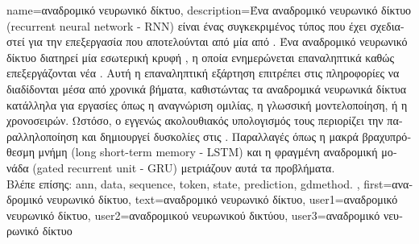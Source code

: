 {name={\foreignlanguage{greek}{αναδρομικό νευρωνικό δίκτυο}},
	description={\foreignlanguage{greek}{Ένα αναδρομικό νευρωνικό δίκτυο} (recurrent neural network - RNN) 
		\foreignlanguage{greek}{είναι ένας συγκεκριμένος τύπος}  \foreignlanguage{greek}{που έχει σχεδιαστεί για την 
		επεξεργασία}  \foreignlanguage{greek}{που αποτελούνται από μία}  \foreignlanguage{greek}{από}
		. \foreignlanguage{greek}{Ένα αναδρομικό νευρωνικό δίκτυο διατηρεί μία εσωτερική κρυφή} ,
		\foreignlanguage{greek}{η οποία ενημερώνεται επαναληπτικά καθώς επεξεργάζονται νέα} . 
		\foreignlanguage{greek}{Αυτή η επαναληπτική εξάρτηση επιτρέπει στις πληροφορίες να διαδίδονται μέσα από χρονικά βήματα,
		καθιστώντας τα αναδρομικά νευρωνικά δίκτυα κατάλληλα για εργασίες όπως η αναγνώριση ομιλίας, η γλωσσική μοντελοποίηση, 
		ή η}  \foreignlanguage{greek}{χρονοσειρών. Ωστόσο, ο εγγενώς ακολουθιακός υπολογισμός τους περιορίζει 
		την παραλληλοποίηση και δημιουργεί δυσκολίες στις} . \foreignlanguage{greek}{Παραλλαγές όπως η 
		μακρά βραχυπρόθεσμη μνήμη} (long short-term memory - LSTM) \foreignlanguage{greek}{και η φραγμένη αναδρομική μονάδα} 
		(gated recurrent unit - GRU) \foreignlanguage{greek}{μετριάζουν αυτά τα προβλήματα.} 
		\\
		\foreignlanguage{greek}{Βλέπε επίσης:} \gls{ann}, \gls{data}, \gls{sequence}, \gls{token}, \gls{state}, \gls{prediction}, \gls{gdmethod}. }, 
 	first={\foreignlanguage{greek}{αναδρομικό νευρωνικό δίκτυο}},
 	text={\foreignlanguage{greek}{αναδρομικό νευρωνικό δίκτυο}},
	user1={\foreignlanguage{greek}{αναδρομικό νευρωνικό δίκτυο}}, %
	user2={\foreignlanguage{greek}{αναδρομικού νευρωνικού δικτύου}}, %
	user3={\foreignlanguage{greek}{αναδρομικό νευρωνικό δίκτυο}} %
}%

